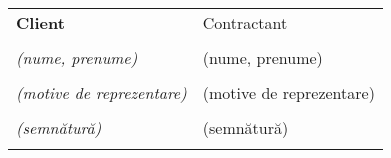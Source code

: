 
\mbox{}\vfill %
\begin{tabu}{X X} \tabucline{}
	\rowfont[c]\bfseries Client & Contractant \\
	[10pt]\makebox[8cm]{\hrulefill} & \makebox[8cm]{\hrulefill} \\
	\rowfont[c]\itshape (nume, prenume) & (nume, prenume) \\
	[10pt]\makebox[8cm]{\hrulefill} & \makebox[8cm]{\hrulefill} \\
	\rowfont[c]\itshape (motive de reprezentare) & (motive de reprezentare) \\
	[10pt]\makebox[8cm]{\hrulefill} & \makebox[8cm]{\hrulefill} \\
	\rowfont[c]\itshape (semnătură) & (semnătură) \\[4cm] \\
\end{tabu}
\pagebreak
